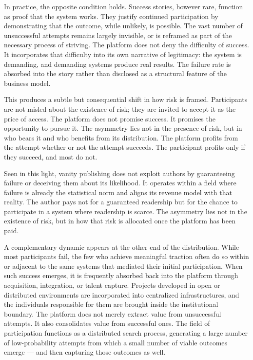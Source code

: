 \documentclass[12pt, a4paper]{article}
\begin{document}
In practice, the opposite condition holds. Success stories, however rare, function as proof that the system works. They justify continued participation by demonstrating that the outcome, while unlikely, is possible. The vast number of unsuccessful attempts remains largely invisible, or is reframed as part of the necessary process of striving. The platform does not deny the difficulty of success. It incorporates that difficulty into its own narrative of legitimacy: the system is demanding, and demanding systems produce real results. The failure rate is absorbed into the story rather than disclosed as a structural feature of the business model.

This produces a subtle but consequential shift in how risk is framed. Participants are not misled about the existence of risk; they are invited to accept it as the price of access. The platform does not promise success. It promises the opportunity to pursue it. The asymmetry lies not in the presence of risk, but in who bears it and who benefits from its distribution. The platform profits from the attempt whether or not the attempt succeeds. The participant profits only if they succeed, and most do not.

Seen in this light, vanity publishing does not exploit authors by guaranteeing failure or deceiving them about its likelihood. It operates within a field where failure is already the statistical norm and aligns its revenue model with that reality. The author pays not for a guaranteed readership but for the chance to participate in a system where readership is scarce. The asymmetry lies not in the existence of risk, but in how that risk is allocated once the platform has been paid.

A complementary dynamic appears at the other end of the distribution. While most participants fail, the few who achieve meaningful traction often do so within or adjacent to the same systems that mediated their initial participation. When such success emerges, it is frequently absorbed back into the platform through acquisition, integration, or talent capture. Projects developed in open or distributed environments are incorporated into centralized infrastructures, and the individuals responsible for them are brought inside the institutional boundary. The platform does not merely extract value from unsuccessful attempts. It also consolidates value from successful ones. The field of participation functions as a distributed search process, generating a large number of low-probability attempts from which a small number of viable outcomes emerge — and then capturing those outcomes as well.
\end{document}
